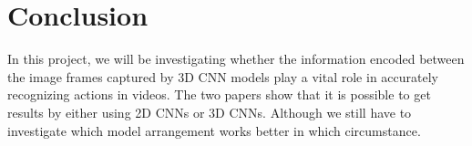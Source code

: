 \section{Conclusion}

In this project, we will be investigating whether the information encoded between the image frames captured by 3D CNN models play a vital role in accurately recognizing actions in videos. The two papers show that it is possible to get results by either using 2D CNNs or 3D CNNs. Although we still have to investigate which model arrangement works better in which circumstance. 
 \par
\vspace{0.4in}

  \par

\par

